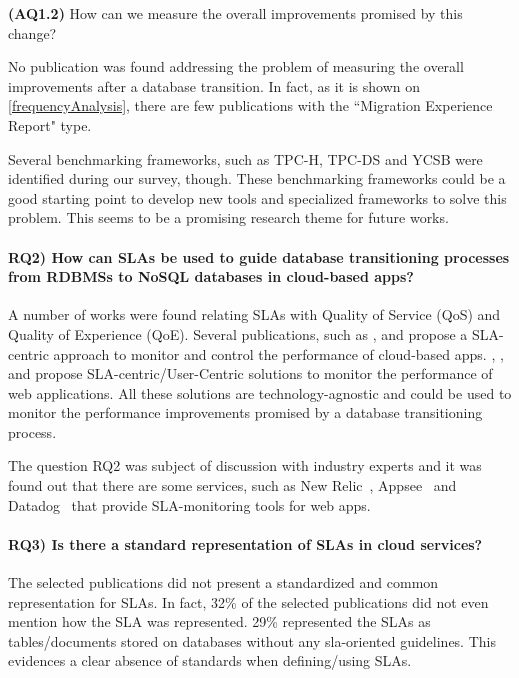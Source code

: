 \documentclass[]{tEIS2e}
\theoremstyle{plain}
\theoremstyle{remark}
\begin{document}
{\textbf{(AQ1.2)} How can we measure the overall improvements promised by this change?

No publication was found addressing the problem of measuring the overall improvements after a database transition. In fact, as it is shown on \ref{frequencyAnalysis}, there are few publications with the ``Migration Experience Report"  type. 

Several benchmarking frameworks, such as TPC-H, TPC-DS and YCSB were identified\citep{6616442} during our survey, though. These benchmarking frameworks could be a good starting point to develop new tools and specialized frameworks to solve this problem. This seems to be a promising research theme for future works.

\paragraph*{\textbf{RQ2)} How can SLAs be used to guide database transitioning processes from RDBMSs to NoSQL databases in cloud-based apps? }

A number of works were found relating SLAs with Quality of Service (QoS) and Quality of Experience (QoE). Several publications, such as \citep{Xiong:2012:DMR:2213598.2213614}, \citep{Konstantinou:2012:TEN:2213836.2213943} and \citep{Klems:2012:RQM:2477172.2477488} propose a SLA-centric approach to monitor and control the performance of cloud-based apps. 
\citep{6253526}, \citep{6461875}, \citep{6511780} and \citep{Xiong:2011:APA:2038916.2038931} propose SLA-centric/User-Centric solutions to monitor the performance of web applications. All these solutions are technology-agnostic and could be used to monitor the performance improvements promised by a database transitioning process.

The question RQ2 was subject of discussion with industry experts and it was found out that there are some services, such as New Relic~\citep{newrelic}, Appsee~\citep{appsee} and Datadog~\citep{datadog} that provide SLA-monitoring tools for web apps.

\paragraph*{\textbf{RQ3)} Is there a standard representation of SLAs in cloud services? }

The selected publications did not present a standardized and common representation for SLAs. In fact, 32\% of the selected publications did not even mention how the SLA was represented. 29\% represented the SLAs as tables/documents stored on databases without any sla-oriented guidelines. This evidences a clear absence of standards when defining/using SLAs.

}
\end{document}
